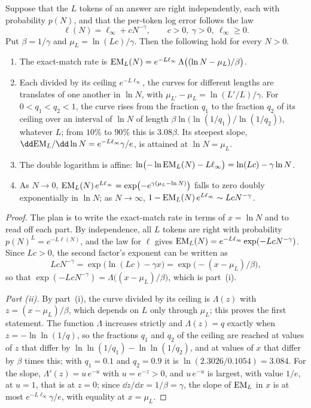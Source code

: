 \begin{refsection}
\begin{proposition}\label{prop:emergence:gumbel}
Suppose that the $L$ tokens of an answer are right independently, each with probability $p(N)$, and that the per-token log error follows the law
\[
\ell(N)=\ell_\infty+cN^{-\gamma},\qquad c>0,\ \gamma>0,\ \ell_\infty\ge0.
\]
Put $\beta=1/\gamma$ and $\mu_L=\ln(Lc)/\gamma$. Then the following hold for every $N>0$.
\begin{enumerate}
\item The exact-match rate is $\mathrm{EM}_L(N)=e^{-L\ell_\infty}\,\Lambda\bigl((\ln N-\mu_L)/\beta\bigr)$.
\item Each divided by its ceiling $e^{-L\ell_\infty}$, the curves for different lengths are translates of one another in $\ln N$, with $\mu_{L'}-\mu_L=\ln(L'/L)/\gamma$. For $0<q_1<q_2<1$, the curve rises from the fraction $q_1$ to the fraction $q_2$ of its ceiling over an interval of $\ln N$ of length $\beta\ln\bigl(\ln(1/q_1)/\ln(1/q_2)\bigr)$, whatever $L$; from $10\%$ to $90\%$ this is $3.08\beta$. Its steepest slope, $\dd\emergenceEM_L/\dd\ln N=e^{-L\ell_\infty}\gamma/e$, is attained at $\ln N=\mu_L$.
\item The double logarithm is affine: $\ln\bigl(-\ln\mathrm{EM}_L(N)-L\ell_\infty\bigr)=\ln(Lc)-\gamma\ln N$.
\item As $N\to0$, $\mathrm{EM}_L(N)\,e^{L\ell_\infty}=\exp\bigl(-e^{\gamma(\mu_L-\ln N)}\bigr)$ falls to zero doubly exponentially in $\ln N$; as $N\to\infty$, $1-\mathrm{EM}_L(N)\,e^{L\ell_\infty}\sim LcN^{-\gamma}$.
\end{enumerate}
\end{proposition}

\begin{proof}
The plan is to write the exact-match rate in terms of $x=\ln N$ and to read off each part. By independence, all $L$ tokens are right with probability $p(N)^L=e^{-L\ell(N)}$, and the law for $\ell$ gives $\mathrm{EM}_L(N)=e^{-L\ell_\infty}\exp(-LcN^{-\gamma})$. Since $Lc>0$, the second factor's exponent can be written as
\[
LcN^{-\gamma}=\exp\bigl(\ln(Lc)-\gamma x\bigr)=\exp\bigl(-(x-\mu_L)/\beta\bigr),
\]
so that $\exp(-LcN^{-\gamma})=\Lambda\bigl((x-\mu_L)/\beta\bigr)$, which is part~(i).

\emph{Part (ii).} By part~(i), the curve divided by its ceiling is $\Lambda(z)$ with $z=(x-\mu_L)/\beta$, which depends on $L$ only through $\mu_L$; this proves the first statement. The function $\Lambda$ increases strictly and $\Lambda(z)=q$ exactly when $z=-\ln\ln(1/q)$, so the fractions $q_1$ and $q_2$ of the ceiling are reached at values of $z$ that differ by $\ln\ln(1/q_1)-\ln\ln(1/q_2)$, and at values of $x$ that differ by $\beta$ times this; with $q_1=0.1$ and $q_2=0.9$ it is $\ln(2.3026/0.1054)=3.084$. For the slope, $\Lambda'(z)=u\,e^{-u}$ with $u=e^{-z}>0$, and $u\,e^{-u}$ is largest, with value $1/e$, at $u=1$, that is at $z=0$; since $\dd z/\dd x=1/\beta=\gamma$, the slope of $\mathrm{EM}_L$ in $x$ is at most $e^{-L\ell_\infty}\gamma/e$, with equality at $x=\mu_L$.


\end{proof}
\end{refsection}
